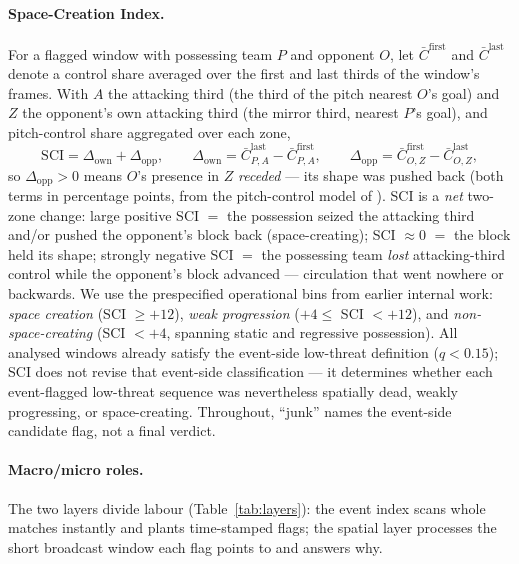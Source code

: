 \documentclass[11pt]{article}
\begin{document}
\paragraph{Space-Creation Index.} For a flagged window with possessing team
$P$ and opponent $O$, let $\bar C^{\text{first}}$ and $\bar C^{\text{last}}$
denote a control share averaged over the first and last thirds of the window's
frames. With $A$ the attacking third (the third of the pitch nearest $O$'s goal) and
$Z$ the opponent's own attacking third (the mirror third, nearest $P$'s goal),
and pitch-control share aggregated over each zone,
\begin{equation}
\mathrm{SCI} = \Delta_{\mathrm{own}} + \Delta_{\mathrm{opp}},\qquad
\Delta_{\mathrm{own}} = \bar C^{\text{last}}_{P,A} - \bar C^{\text{first}}_{P,A},\qquad
\Delta_{\mathrm{opp}} = \bar C^{\text{first}}_{O,Z} - \bar C^{\text{last}}_{O,Z},
\end{equation}
so $\Delta_{\mathrm{opp}}>0$ means $O$'s presence in $Z$ \emph{receded} --- its
shape was pushed back (both terms in
percentage points, from the pitch-control model of
\citet{spearman2017physics}). SCI is a \emph{net} two-zone change: large positive
SCI $=$ the possession seized the attacking third and/or pushed the opponent's
block back (space-creating); SCI $\approx 0$ $=$ the
block held its shape; strongly negative SCI $=$ the possessing team \emph{lost}
attacking-third control while the opponent's block advanced --- circulation that
went nowhere or backwards. We use the prespecified operational bins from earlier
internal work: \emph{space creation} (SCI $\ge +12$), \emph{weak progression}
($+4 \le$ SCI $< +12$), and \emph{non-space-creating} (SCI $< +4$, spanning
static and regressive possession). All analysed windows already satisfy the
event-side low-threat definition ($q<0.15$); SCI does not revise that
event-side classification --- it determines whether each event-flagged low-threat
sequence was nevertheless spatially dead, weakly progressing, or space-creating.
Throughout, ``junk'' names the event-side candidate flag, not a final verdict.

\paragraph{Macro/micro roles.} The two layers divide labour
(Table~\ref{tab:layers}): the event index scans whole matches instantly and
plants time-stamped flags; the spatial layer processes the short broadcast
window each flag points to and answers why.
\end{document}

